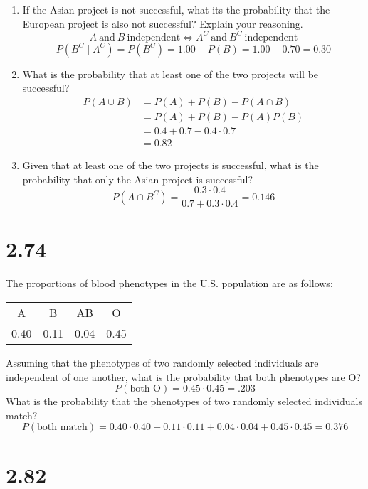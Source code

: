\documentclass[letterpaper,12pt,fleqn]{article}
\begin{document}
\begin{enumerate}[label={\alph*)}]
\item If the Asian project is not successful, what its the probability that the European project is also not successful?
  Explain your reasoning.
  \[A\ \text{and}\ B\ \text{independent}\iff A^C\ \text{and}\ B^C\ \text{independent}\]
  \[P(B^C\mid A^C)=P(B^C)=1.00-P(B)=1.00-0.70=0.30\]

\item What is the probability that at least one of the two projects will be successful?
  \begin{align*}
    P(A\cup B) &= P(A)+P(B)-P(A\cap B) \\
    &= P(A)+P(B)-P(A)P(B) \\
    &= 0.4+0.7-0.4\cdot0.7 \\
    &= 0.82
  \end{align*}

\item Given that at least one of the two projects is successful, what is the probability that only the Asian project is
  successful?
  \[P(A\cap B^C)=\frac{0.3\cdot0.4}{0.7+0.3\cdot0.4}=0.146\]
\end{enumerate}

\section*{2.74}

The proportions of blood phenotypes in the U.S. population are as follows:

\begin{tabular}{cccc}
  A & B & AB & O \\
  0.40 & 0.11 & 0.04 & 0.45
\end{tabular}

Assuming that the phenotypes of two randomly selected individuals are independent of one another, what is the probability
that both phenotypes are O?
\[P\left(\text{both O}\right)=0.45\cdot0.45=.203\]
What is the probability that the phenotypes of two randomly selected individuals match?
\[P\left(\text{both match}\right)=0.40\cdot0.40+0.11\cdot0.11+0.04\cdot0.04+0.45\cdot0.45=0.376\]

\section*{2.82}
\end{document}
